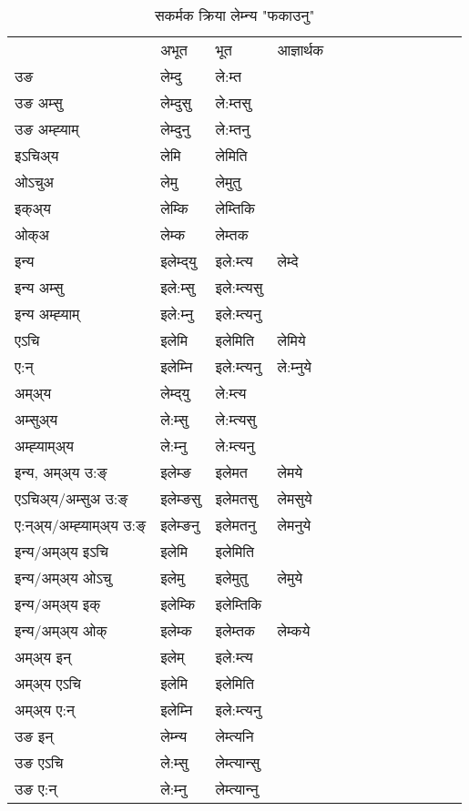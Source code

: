 \begin{table}[H]
\label{emt.vt} \centering
\caption{सकर्मक क्रिया  लेम्‍न्य  "फकाउनु"  }
\begin{tabular}{l|l|l|l|l|l|l|l|l|l|l|l|l}  \toprule
&अभूत & भूत & आज्ञार्थक \\ 
उङ &लेम्दु &ले:म्त \\ 
उङ अम्सु&लेम्दुसु &ले:म्तसु \\ 
उङ अम्ह्‍याम्&लेम्दुनु &ले:म्तनु \\ 
इऽचिअ्य &लेमि &लेमिति   \\ 
ओऽचुअ        &लेमु &लेमुतु   \\ 
इक्अ्य&लेम्कि &लेम्तिकि   \\ 
ओक्अ &लेम्क &लेम्तक   \\ 
इन्य & इलेम्द्‌यु  & इले:म्त्य &लेम्दे  \\ 
इन्य अम्सु& इले:म्सु  & इले:म्त्यसु   \\ 
इन्य अम्ह्‍याम्& इले:म्‍नु  & इले:म्त्यनु   \\ 
एऽचि & इलेमि & इलेमिति &लेमिये    \\ 
ए:न् & इलेम्‍नि  & इले:म्त्यनु &ले:म्‍नुये  \\ 
अम्अ्य & लेम्द्‌यु  & ले:म्त्य  \\ 
अम्सुअ्य & ले:म्सु & ले:म्त्यसु  \\ 
अम्ह्‍याम्अ्य & ले:म्‍नु  & ले:म्त्यनु \\ 
\midrule
इन्य, अम्अ्य उ:ङ्‌ &इलेम्ङ &इलेमत &लेमये \\ 
एऽचिअ्य/अम्सुअ उ:ङ्‌ &इलेम्ङसु &इलेमतसु &लेमसुये \\ 
ए:न्अ्य/अम्ह्‍याम्अ्य उ:ङ्‌ &इलेम्ङनु &इलेमतनु &लेमनुये \\ 
इन्य/अम्अ्य इऽचि &इलेमि &इलेमिति    \\ 
इन्य/अम्अ्य ओऽचु &इलेमु &इलेमुतु  &लेमुये  \\ 
इन्य/अम्अ्य इक् &इलेम्कि &इलेम्तिकि   \\ 
इन्य/अम्अ्य ओक् &इलेम्क &इलेम्तक  &लेम्कये  \\ 
अम्अ्य इन् & इलेम् & इले:म्त्य   \\ 
अम्अ्य एऽचि & इलेमि & इलेमिति    \\ 
अम्अ्य ए:न् & इलेम्‍नि  & इले:म्त्यनु  \\ 
\midrule
उङ इन् & लेम्‍न्य  & लेम्त्यनि  \\ 
उङ एऽचि & ले:म्सु  & लेम्त्यान्सु   \\ 
उङ ए:न्& ले:म्‍नु  & लेम्त्यान्‍नु   \\ 
\bottomrule
\end{tabular}
\end{table}


